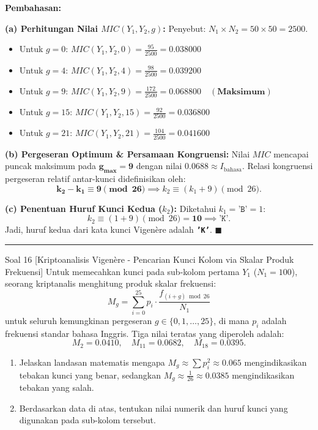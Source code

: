 \documentclass[11pt,a4paper]{article}
\newenvironment{solusi}{\noindent\textbf{\textsf{Pembahasan:}}\par\vspace{0.2em}}{\hfill$\blacksquare$\vspace{1em}\par\hrule\vspace{1em}}
\begin{document}
\begin{solusi}
\textbf{(a) Perhitungan Nilai $MIC(Y_1, Y_2, g)$:}
Penyebut: $N_1 \times N_2 = 50 \times 50 = 2500$.
\begin{itemize}[leftmargin=*]
    \item Untuk $g = 0$: $MIC(Y_1, Y_2, 0) = \frac{95}{2500} = \mathbf{0.038000}$
    \item Untuk $g = 4$: $MIC(Y_1, Y_2, 4) = \frac{98}{2500} = \mathbf{0.039200}$
    \item Untuk $g = 9$: $MIC(Y_1, Y_2, 9) = \frac{172}{2500} = \mathbf{0.068800} \quad (\textbf{Maksimum})$
    \item Untuk $g = 15$: $MIC(Y_1, Y_2, 15) = \frac{92}{2500} = \mathbf{0.036800}$
    \item Untuk $g = 21$: $MIC(Y_1, Y_2, 21) = \frac{104}{2500} = \mathbf{0.041600}$
\end{itemize}

\vspace{0.2cm}
\textbf{(b) Pergeseran Optimum \& Persamaan Kongruensi:}
Nilai $MIC$ mencapai puncak maksimum pada $\mathbf{g_{\max} = 9}$ dengan nilai $0.0688 \approx I_{\text{bahasa}}$.
Relasi kongruensi pergeseran relatif antar-kunci didefinisikan oleh:
\[
\mathbf{k_2 - k_1 \equiv 9 \pmod{26}} \implies k_2 \equiv (k_1 + 9) \pmod{26}.
\]

\vspace{0.2cm}
\textbf{(c) Penentuan Huruf Kunci Kedua ($k_2$):}
Diketahui $k_1 = \texttt{'B'} = 1$:
\[
k_2 \equiv (1 + 9) \pmod{26} = \mathbf{10} \implies \mathbf{\texttt{'K'}}.
\]
Jadi, huruf kedua dari kata kunci Vigenère adalah \textbf{\texttt{'K'}}.
\end{solusi}


\begin{soalanalisis}{Soal 16 [Kriptoanalisis Vigenère - Pencarian Kunci Kolom via Skalar Produk Frekuensi]}
Untuk memecahkan kunci pada sub-kolom pertama $Y_1$ ($N_1 = 100$), seorang kriptanalis menghitung produk skalar frekuensi:
\[
M_g = \sum_{i=0}^{25} p_i \cdot \frac{f_{(i+g) \bmod 26}}{N_1}
\]
untuk seluruh kemungkinan pergeseran $g \in \{0, 1, \dots, 25\}$, di mana $p_i$ adalah frekuensi standar bahasa Inggris. Tiga nilai teratas yang diperoleh adalah:
\[
M_2 = 0.0410, \quad M_{11} = 0.0682, \quad M_{18} = 0.0395.
\]
\begin{enumerate}[label=(\alph*)]
    \item Jelaskan landasan matematis mengapa $M_g \approx \sum p_i^2 \approx 0.065$ mengindikasikan tebakan kunci yang benar, sedangkan $M_g \approx \frac{1}{26} \approx 0.0385$ mengindikasikan tebakan yang salah.
    \item Berdasarkan data di atas, tentukan nilai numerik dan huruf kunci yang digunakan pada sub-kolom tersebut.
\end{enumerate}
\end{soalanalisis}
\end{document}
